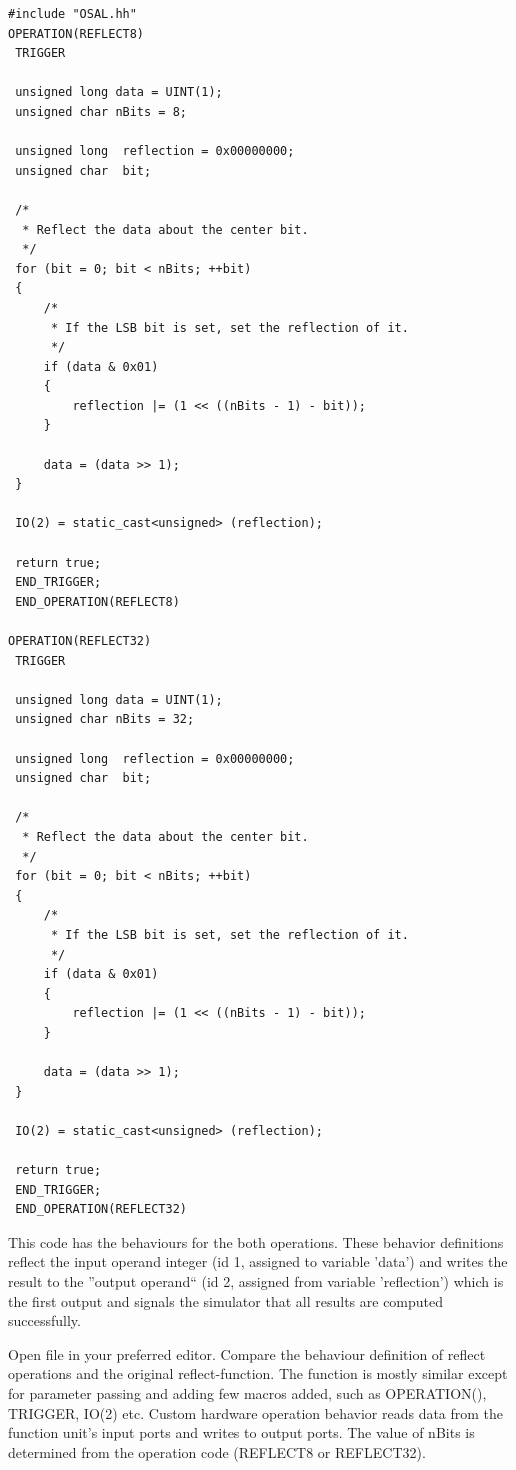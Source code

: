 \documentclass[twoside]{tceusermanual}
\begin{document}
\begin{verbatim}
#include "OSAL.hh"
OPERATION(REFLECT8)
 TRIGGER

 unsigned long data = UINT(1);
 unsigned char nBits = 8;

 unsigned long  reflection = 0x00000000;
 unsigned char  bit;

 /*
  * Reflect the data about the center bit.
  */
 for (bit = 0; bit < nBits; ++bit)
 {
     /*
      * If the LSB bit is set, set the reflection of it.
      */
     if (data & 0x01)
     {
         reflection |= (1 << ((nBits - 1) - bit));
     }

     data = (data >> 1);
 }

 IO(2) = static_cast<unsigned> (reflection);

 return true;
 END_TRIGGER;
 END_OPERATION(REFLECT8)

OPERATION(REFLECT32)
 TRIGGER

 unsigned long data = UINT(1);
 unsigned char nBits = 32;

 unsigned long  reflection = 0x00000000;
 unsigned char  bit;

 /*
  * Reflect the data about the center bit.
  */
 for (bit = 0; bit < nBits; ++bit)
 {
     /*
      * If the LSB bit is set, set the reflection of it.
      */
     if (data & 0x01)
     {
         reflection |= (1 << ((nBits - 1) - bit));
     }

     data = (data >> 1);
 }

 IO(2) = static_cast<unsigned> (reflection);

 return true;
 END_TRIGGER;
 END_OPERATION(REFLECT32)
\end{verbatim}

This code has the behaviours for the both operations. These behavior
definitions reflect the input operand integer (id 1, assigned to
variable 'data') and writes the result to the ''output operand`` (id
2, assigned from variable 'reflection') which is the first output and
signals the simulator that all results are computed successfully.

Open file  in your preferred editor. Compare the behaviour
definition of reflect operations and the original
reflect-function. The function is mostly similar except for parameter
passing and adding few macros added, such as OPERATION(), TRIGGER,
IO(2) etc. Custom hardware operation behavior reads data from the
function unit's input ports and writes to output ports. The value of
nBits is determined from the operation code (REFLECT8 or REFLECT32).
\end{document}
